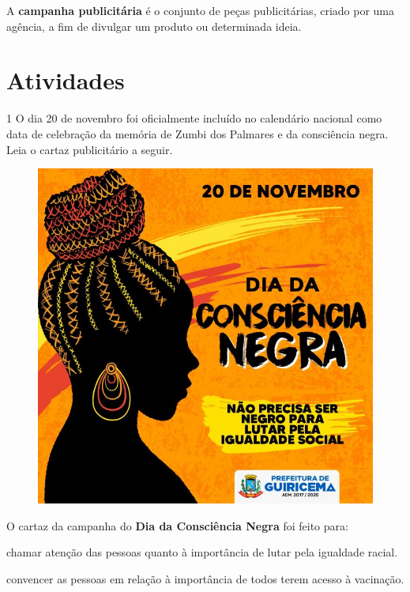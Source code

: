 \begin{conteudo}
\begin{conteudo}
\begin{conteudo}
\begin{conteudo}
{A \textbf{campanha publicitária} é o conjunto de peças publicitárias,
criado por uma agência, a fim de divulgar um produto ou
determinada ideia.
}

\section*{Atividades}

\num{1} O dia 20 de novembro foi oficialmente incluído no calendário 
nacional como data de celebração da memória de Zumbi dos Palmares e da
consciência negra. Leia o cartaz publicitário a seguir.


\begin{figure}[htpb!]
\centering
\includegraphics[width=.8\textwidth]{media/image14.jpeg}
\end{figure}

\pagebreak
O cartaz da campanha do \textbf{Dia da Consciência Negra} foi feito para:

\begin{escolha}
\begin{boxlist}
 chamar atenção das pessoas quanto à importância de lutar pela igualdade racial.

 convencer as pessoas em relação à importância de todos terem acesso à vacinação.


\end{boxlist}
\end{escolha}
\end{conteudo}
\end{conteudo}
\end{conteudo}
\end{conteudo}
